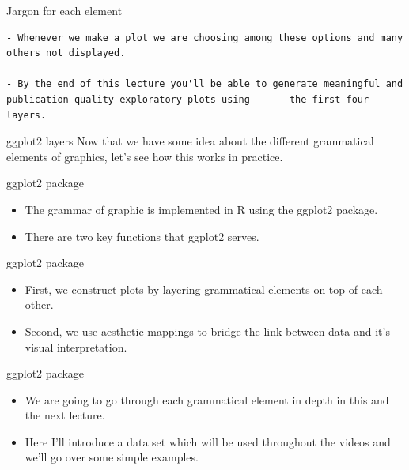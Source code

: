 \documentclass[
  ignorenonframetext,
]{beamer}
\begin{document}
\begin{frame}[fragile]{Jargon for each element}
\label{jargon-for-each-element-1}
\begin{verbatim}
- Whenever we make a plot we are choosing among these options and many others not displayed. 

- By the end of this lecture you'll be able to generate meaningful and publication-quality exploratory plots using       the first four layers.
\end{verbatim}
\end{frame}

\begin{frame}{ggplot2 layers}
\label{ggplot2-layers}
Now that we have some idea about the different grammatical elements of
graphics, let's see how this works in practice.
\end{frame}

\begin{frame}{ggplot2 package}
\label{ggplot2-package}
\begin{itemize}
\item
  The grammar of graphic is implemented in R using the ggplot2 package.
\item
  There are two key functions that ggplot2 serves.
\end{itemize}
\end{frame}

\begin{frame}{ggplot2 package}
\label{ggplot2-package-1}
\begin{itemize}
\item
  First, we construct plots by layering grammatical elements on top of
  each other.
\item
  Second, we use aesthetic mappings to bridge the link between data and
  it's visual interpretation.
\end{itemize}
\end{frame}

\begin{frame}{ggplot2 package}
\label{ggplot2-package-2}
\begin{itemize}
\item
  We are going to go through each grammatical element in depth in this
  and the next lecture.
\item
  Here I'll introduce a data set which will be used throughout the
  videos and we'll go over some simple examples.
\end{itemize}
\end{frame}
\end{document}
